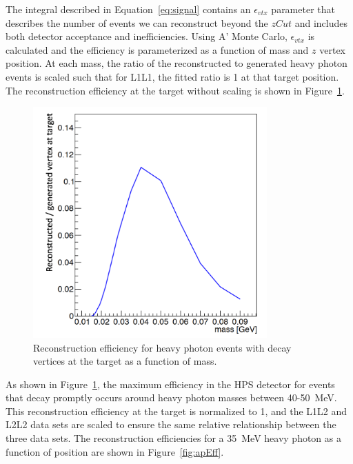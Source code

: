 The integral described in Equation~\eqref{eq:signal} contains an $\epsilon_{vtx}$ parameter that describes the number of events we can reconstruct beyond the $zCut$ and includes both detector acceptance and inefficiencies. Using A' Monte Carlo, $\epsilon_{vtx}$ is calculated and the efficiency is parameterized as a function of mass and $z$ vertex position. At each mass, the ratio of the reconstructed to generated heavy photon events is scaled such that for L1L1, the fitted ratio is 1 at that target position. The reconstruction efficiency at the target without scaling is shown in Figure~\ref{fig:rawEff}.

\begin{figure}[H]
  \centering
      \includegraphics[width=0.8\textwidth]{pics/searching/rawEffL1L1.png}
  \caption[Reconstruction efficiency for heavy photons that decay at the target]{Reconstruction efficiency for heavy photon events with decay vertices at the target as a function of mass.}
  \label{fig:rawEff}
\end{figure} 

As shown in Figure~\ref{fig:rawEff}, the maximum efficiency in the HPS detector for events that decay promptly occurs around heavy photon masses between 40-50~MeV. This reconstruction efficiency at the target is normalized to 1, and the L1L2 and L2L2 data sets are scaled to ensure the same relative relationship between the three data sets. The reconstruction efficiencies for a 35~MeV heavy photon as a function of position are shown in Figure~\ref{fig:apEff}. 

